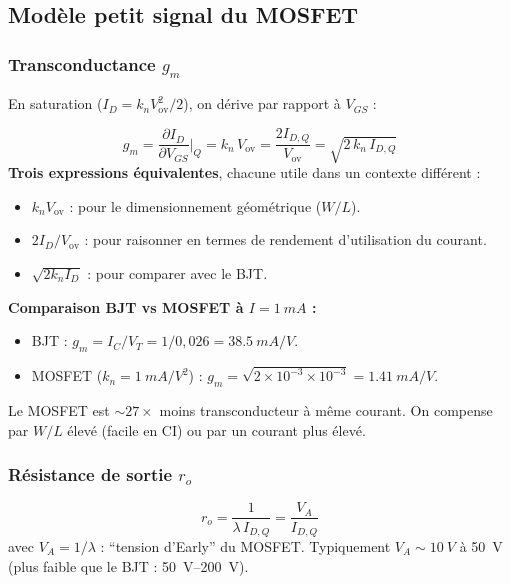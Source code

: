 \documentclass[12pt,a4paper,twoside]{book}
\begin{document}
\subsection{Modèle petit signal du MOSFET}

\subsubsection*{Transconductance $g_m$}

En saturation ($I_D = k_n V_{\text{ov}}^2/2$), on dérive par rapport à $V_{GS}$ :

\begin{formule}
\[
\boxed{g_m = \frac{\partial I_D}{\partial V_{GS}}\bigg|_Q = k_n\,V_{\text{ov}} = \frac{2I_{D,Q}}{V_{\text{ov}}} = \sqrt{2\,k_n\,I_{D,Q}}}
\]
\textbf{Trois expressions équivalentes}, chacune utile dans un contexte différent :
\begin{itemize}[nosep]
\item $k_n V_{\text{ov}}$ : pour le dimensionnement géométrique ($W/L$).
\item $2I_D/V_{\text{ov}}$ : pour raisonner en termes de rendement d'utilisation du courant.
\item $\sqrt{2k_n I_D}$ : pour comparer avec le BJT.
\end{itemize}

\textbf{Comparaison BJT vs MOSFET à $I = \SI{1}{mA}$ :}
\begin{itemize}[nosep]
\item BJT : $g_m = I_C/V_T = 1/0{,}026 = \SI{38.5}{mA/V}$.
\item MOSFET ($k_n = \SI{1}{mA/V^2}$) : $g_m = \sqrt{2\times10^{-3}\times10^{-3}} = \SI{1.41}{mA/V}$.
\end{itemize}
Le MOSFET est $\sim 27\times$ moins transconducteur à même courant. On compense par $W/L$ élevé (facile en CI) ou par un courant plus élevé.
\end{formule}

\subsubsection*{Résistance de sortie $r_o$}

\begin{formule}
\[
\boxed{r_o = \frac{1}{\lambda\,I_{D,Q}} = \frac{V_A}{I_{D,Q}}}
\]
avec $V_A = 1/\lambda$ : ``tension d'Early'' du MOSFET. Typiquement $V_A \sim \SI{10}{V}$ à \SI{50}{V} (plus faible que le BJT : \SI{50}{V}--\SI{200}{V}).
\end{formule}
\end{document}
